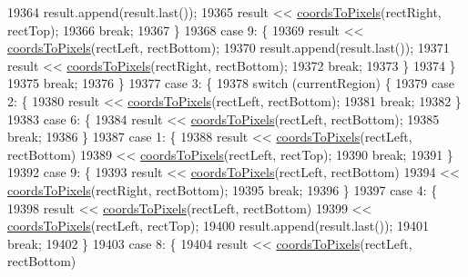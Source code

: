 \begin{DoxyCode}
19364       result.append(result.last());
19365       result << \hyperlink{class_q_c_p_abstract_plottable_ade710a776104b14c1c835168ce1bfc5c}{coordsToPixels}(rectRight, rectTop);
19366       \textcolor{keywordflow}{break};
19367     \}
19368     \textcolor{keywordflow}{case} 9: \{
19369       result << \hyperlink{class_q_c_p_abstract_plottable_ade710a776104b14c1c835168ce1bfc5c}{coordsToPixels}(rectLeft, rectBottom);
19370       result.append(result.last());
19371       result << \hyperlink{class_q_c_p_abstract_plottable_ade710a776104b14c1c835168ce1bfc5c}{coordsToPixels}(rectRight, rectBottom);
19372       \textcolor{keywordflow}{break};
19373     \}
19374     \}
19375     \textcolor{keywordflow}{break};
19376   \}
19377   \textcolor{keywordflow}{case} 3: \{
19378     \textcolor{keywordflow}{switch} (currentRegion) \{
19379     \textcolor{keywordflow}{case} 2: \{
19380       result << \hyperlink{class_q_c_p_abstract_plottable_ade710a776104b14c1c835168ce1bfc5c}{coordsToPixels}(rectLeft, rectBottom);
19381       \textcolor{keywordflow}{break};
19382     \}
19383     \textcolor{keywordflow}{case} 6: \{
19384       result << \hyperlink{class_q_c_p_abstract_plottable_ade710a776104b14c1c835168ce1bfc5c}{coordsToPixels}(rectLeft, rectBottom);
19385       \textcolor{keywordflow}{break};
19386     \}
19387     \textcolor{keywordflow}{case} 1: \{
19388       result << \hyperlink{class_q_c_p_abstract_plottable_ade710a776104b14c1c835168ce1bfc5c}{coordsToPixels}(rectLeft, rectBottom)
19389              << \hyperlink{class_q_c_p_abstract_plottable_ade710a776104b14c1c835168ce1bfc5c}{coordsToPixels}(rectLeft, rectTop);
19390       \textcolor{keywordflow}{break};
19391     \}
19392     \textcolor{keywordflow}{case} 9: \{
19393       result << \hyperlink{class_q_c_p_abstract_plottable_ade710a776104b14c1c835168ce1bfc5c}{coordsToPixels}(rectLeft, rectBottom)
19394              << \hyperlink{class_q_c_p_abstract_plottable_ade710a776104b14c1c835168ce1bfc5c}{coordsToPixels}(rectRight, rectBottom);
19395       \textcolor{keywordflow}{break};
19396     \}
19397     \textcolor{keywordflow}{case} 4: \{
19398       result << \hyperlink{class_q_c_p_abstract_plottable_ade710a776104b14c1c835168ce1bfc5c}{coordsToPixels}(rectLeft, rectBottom)
19399              << \hyperlink{class_q_c_p_abstract_plottable_ade710a776104b14c1c835168ce1bfc5c}{coordsToPixels}(rectLeft, rectTop);
19400       result.append(result.last());
19401       \textcolor{keywordflow}{break};
19402     \}
19403     \textcolor{keywordflow}{case} 8: \{
19404       result << \hyperlink{class_q_c_p_abstract_plottable_ade710a776104b14c1c835168ce1bfc5c}{coordsToPixels}(rectLeft, rectBottom)

\end{DoxyCode}
